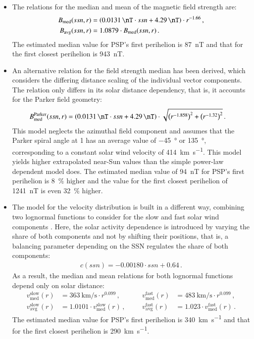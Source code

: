 \begin{itemize}
	\item The relations for the median and mean of the magnetic field strength are:
	\begin{align*}
		B_\text{med}(ssn,r) &= \left(\SI{0.0131}{\nT} \cdot ssn + \SI{4.29}{\nT}\right) \cdot r^{-1.66}	\,,\\
		B_\text{avg}(ssn,r) &= 1.0879 \cdot B_\text{med}(ssn,r)	\,.
	\end{align*}
	 The estimated median value for PSP's first perihelion is \SI{87}{\nano\tesla} and that for the first closest perihelion is \SI{943}{\nano\tesla}.
	
	\item An alternative relation for the field strength median has been derived, which considers the differing distance scaling of the individual vector components. The relation only differs in its solar distance dependency, that is, it accounts for the Parker field geometry:
	\begin{align*}
		B^\text{Parker}_\text{med}(ssn,r) &= \left(\SI{0.0131}{\nT} \cdot ssn + \SI{4.29}{\nT}\right) \cdot \sqrt{\left(r^{-1.858}\right)^2 + \left(r^{-1.32}\right)^2}	\,.
	\end{align*}
	This model neglects the azimuthal field component and assumes that the Parker spiral angle at \SI{1}{\au} has an average value of \SI{-45}{\degree} or \SI{135}{\degree}, corresponding to a constant solar wind velocity of \SI{414}{\km\per\s}.
	This model yields higher extrapolated near-Sun values than the simple power-law dependent model does. The estimated median value of \SI{94}{\nano\tesla} for PSP's first perihelion is \SI{8}{\%} higher and the value for the first closest perihelion of \SI{1241}{\nano\tesla} is even \SI{32}{\%} higher.

	\item The model for the velocity distribution is built in a different way, combining two lognormal functions to consider for the slow and fast solar wind components
	\pagebreak
	 \citep[see the Equation~(5) in][]{Venzmer2018}. Here, the solar activity dependence is introduced by varying the share of both components and not by shifting their positions, that is, a balancing parameter depending on the SSN regulates the share of both components:
	\begin{align*}
		c(ssn) = -0.00180 \cdot ssn + 0.64	\,.
	\end{align*}
	As a result, the median and mean relations for both lognormal functions depend only on solar distance:
	\begin{align*}
		v_\text{med}^\text{slow}(r) &= \SI{363}{\km\per\s} \cdot r^{0.099}	\,,&    &       &v_\text{med}^\text{fast}(r) &= \SI{483}{\km\per\s} \cdot r^{0.099}	\,,\\
		v_\text{avg}^\text{slow}(r) &= 1.0101 \cdot v_\text{med}^\text{slow}(r)	\,,&    &       &v_\text{avg}^\text{fast}(r) &= 1.023 \cdot v_\text{med}^\text{fast}(r)	\,.
	\end{align*}
	 The estimated median value for PSP's first perihelion is \SI{340}{\km\per\s} and that for the first closest perihelion is \SI{290}{\km\per\s}.
	

\end{itemize}
